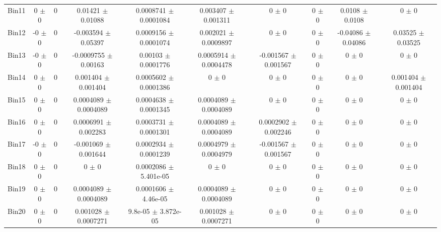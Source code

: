 \begin{tabular}{@{\extracolsep{4pt}}lccccccccc@{}}
     Bin11 & 0 $\pm$ 0 & 0 & 0.01421 $\pm$ 0.01088 & 0.0008741 $\pm$ 0.0001084 & 0.003407 $\pm$ 0.001311 & 0 $\pm$ 0 & 0 $\pm$ 0 & 0.0108 $\pm$ 0.0108 & 0 $\pm$ 0 \\ 
     Bin12 & -0 $\pm$ 0 & 0 & -0.003594 $\pm$ 0.05397 & 0.0009156 $\pm$ 0.0001074 & 0.002021 $\pm$ 0.0009897 & 0 $\pm$ 0 & 0 $\pm$ 0 & -0.04086 $\pm$ 0.04086 & 0.03525 $\pm$ 0.03525 \\ 
     Bin13 & -0 $\pm$ 0 & 0 & -0.0009755 $\pm$ 0.00163 & 0.00103 $\pm$ 0.0001776 & 0.0005914 $\pm$ 0.0004478 & -0.001567 $\pm$ 0.001567 & 0 $\pm$ 0 & 0 $\pm$ 0 & 0 $\pm$ 0 \\ 
     Bin14 & 0 $\pm$ 0 & 0 & 0.001404 $\pm$ 0.001404 & 0.0005602 $\pm$ 0.0001386 & 0 $\pm$ 0 & 0 $\pm$ 0 & 0 $\pm$ 0 & 0 $\pm$ 0 & 0.001404 $\pm$ 0.001404 \\ 
     Bin15 & 0 $\pm$ 0 & 0 & 0.0004089 $\pm$ 0.0004089 & 0.0004638 $\pm$ 0.0001345 & 0.0004089 $\pm$ 0.0004089 & 0 $\pm$ 0 & 0 $\pm$ 0 & 0 $\pm$ 0 & 0 $\pm$ 0 \\ 
     Bin16 & 0 $\pm$ 0 & 0 & 0.0006991 $\pm$ 0.002283 & 0.0003731 $\pm$ 0.0001301 & 0.0004089 $\pm$ 0.0004089 & 0.0002902 $\pm$ 0.002246 & 0 $\pm$ 0 & 0 $\pm$ 0 & 0 $\pm$ 0 \\ 
     Bin17 & -0 $\pm$ 0 & 0 & -0.001069 $\pm$ 0.001644 & 0.0002934 $\pm$ 0.0001239 & 0.0004979 $\pm$ 0.0004979 & -0.001567 $\pm$ 0.001567 & 0 $\pm$ 0 & 0 $\pm$ 0 & 0 $\pm$ 0 \\ 
     Bin18 & 0 $\pm$ 0 & 0 & 0 $\pm$ 0 & 0.0002086 $\pm$ 5.401e-05 & 0 $\pm$ 0 & 0 $\pm$ 0 & 0 $\pm$ 0 & 0 $\pm$ 0 & 0 $\pm$ 0 \\ 
     Bin19 & 0 $\pm$ 0 & 0 & 0.0004089 $\pm$ 0.0004089 & 0.0001606 $\pm$ 4.46e-05 & 0.0004089 $\pm$ 0.0004089 & 0 $\pm$ 0 & 0 $\pm$ 0 & 0 $\pm$ 0 & 0 $\pm$ 0 \\ 
     Bin20 & 0 $\pm$ 0 & 0 & 0.001028 $\pm$ 0.0007271 & 9.8e-05 $\pm$ 3.872e-05 & 0.001028 $\pm$ 0.0007271 & 0 $\pm$ 0 & 0 $\pm$ 0 & 0 $\pm$ 0 & 0 $\pm$ 0 \\ 
\hline\hline
  \end{tabular}
